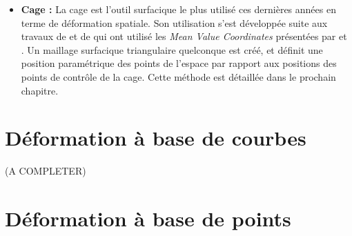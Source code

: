 \begin{itemize}
\item{\textbf{Cage :}} La cage est l'outil surfacique le plus utilisé ces
dernières années en terme de déformation spatiale. Son utilisation s'est
développée suite aux travaux de \cite{JSW05} et de \cite{FKR05} qui ont
utilisé les \textit{Mean Value Coordinates} présentées par \cite{Flo03} et
\cite{FKR05}. Un maillage surfacique triangulaire quelconque est créé, et
définit une position paramétrique des points de l'espace par rapport aux
positions des points de contrôle de la cage. Cette méthode est détaillée dans
le prochain chapitre.

\end{itemize}

\section{Déformation à base de courbes} 

(A COMPLETER)

\section{Déformation à base de points}

